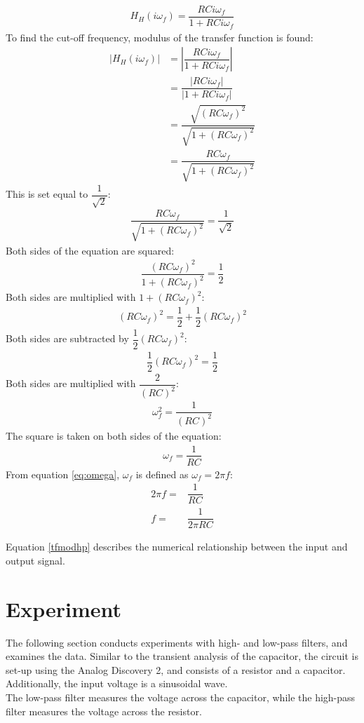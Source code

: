 \begin{align*}
H_{H}(i \omega_f) = \dfrac{RCi \omega_f}{1 + RCi \omega_f}
\end{align*}
To find the cut-off frequency, modulus of the transfer function is found:
\begin{align}
\left|H_{H}(i \omega_f)\right| &= \left|\dfrac{RCi \omega_f}{1 + RCi \omega_f} \right| \\
 &= \dfrac{|RCi \omega_f|}{|1 + RCi \omega_f |} \\
 &= \dfrac{\sqrt{(RC \omega_f)^2}}{\sqrt{1 + (RC \omega_f)^2 }} \\
 &= \dfrac{RC \omega_f}{\sqrt{1 + (RC \omega_f)^2 }} \label{tfmodhp}
\end{align} 
This is set equal to $\dfrac{1}{\sqrt{2}}$:
\begin{align}
\dfrac{RC \omega_f}{\sqrt{1 + (RC \omega_f)^2 }}=\dfrac{1}{\sqrt{2}}
\end{align}
Both sides of the equation are squared:
\begin{align}
\dfrac{(RC \omega_f)^2}{1 + (RC \omega_f)^2 }=\dfrac{1}{2}
\end{align}
Both sides are multiplied with $1+(RC\omega_f)^2$:
\begin{align}
(RC \omega_f)^2 =\dfrac{1}{2}+\dfrac{1}{2}(RC\omega_f)^2
\end{align}
Both sides are subtracted  by $\dfrac{1}{2}(RC\omega_f)^2$:
\begin{align}
\dfrac{1}{2}(RC \omega_f)^2 =\dfrac{1}{2}
\end{align}
Both sides are multiplied with $\dfrac{2}{(RC)^2}$:
\begin{align}
\omega_f^2 =\dfrac{1}{(RC)^2}
\end{align}
The square is taken on both sides of the equation:
\begin{align}
\omega_f =\dfrac{1}{RC}
\end{align}
From equation \eqref{eq:omega}, $\omega_f$ is defined as $\omega_f=2 \pi f$:
\begin{align}
2\pi f=&\dfrac{1}{RC}
\\
f=&\dfrac{1}{2\pi RC}
\end{align}

Equation \eqref{tfmodhp} describes the numerical relationship between the input and output signal.


\section{Experiment} \label{experiment}
The following section conducts experiments with high- and low-pass filters, and examines the data. Similar to the transient analysis of the capacitor, the circuit is set-up using the Analog Discovery 2, and consists of a resistor and a capacitor. Additionally, the input voltage  is a  sinusoidal wave. \\
The low-pass filter measures the voltage across the capacitor, while the high-pass filter measures the voltage across the resistor.

